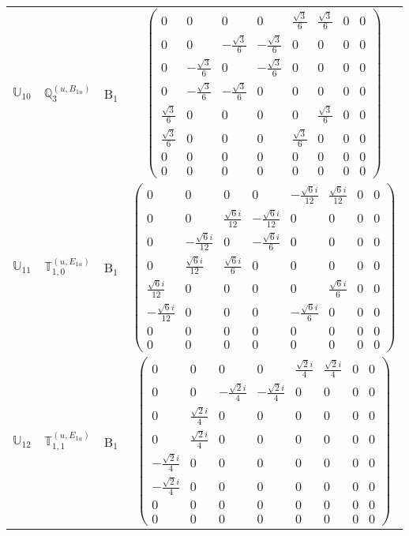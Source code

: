 \documentclass[fleqn,10pt,landscape]{article}
\begin{document}
\begin{itemize}
\begin{center}
\begin{longtable}{c|c|c|c}
$ \mathbb{U}_{10} $ & $\mathbb{Q}_{3}^{(u,B_{1u})}$ & B$_{1}$ & $\begin{pmatrix} 0 & 0 & 0 & 0 & \frac{\sqrt{3}}{6} & \frac{\sqrt{3}}{6} & 0 & 0 \\ 0 & 0 & - \frac{\sqrt{3}}{6} & - \frac{\sqrt{3}}{6} & 0 & 0 & 0 & 0 \\ 0 & - \frac{\sqrt{3}}{6} & 0 & - \frac{\sqrt{3}}{6} & 0 & 0 & 0 & 0 \\ 0 & - \frac{\sqrt{3}}{6} & - \frac{\sqrt{3}}{6} & 0 & 0 & 0 & 0 & 0 \\ \frac{\sqrt{3}}{6} & 0 & 0 & 0 & 0 & \frac{\sqrt{3}}{6} & 0 & 0 \\ \frac{\sqrt{3}}{6} & 0 & 0 & 0 & \frac{\sqrt{3}}{6} & 0 & 0 & 0 \\ 0 & 0 & 0 & 0 & 0 & 0 & 0 & 0 \\ 0 & 0 & 0 & 0 & 0 & 0 & 0 & 0 \end{pmatrix}$ \\
$ \mathbb{U}_{11} $ & $\mathbb{T}_{1,0}^{(u,E_{1u})}$ & B$_{1}$ & $\begin{pmatrix} 0 & 0 & 0 & 0 & - \frac{\sqrt{6} i}{12} & \frac{\sqrt{6} i}{12} & 0 & 0 \\ 0 & 0 & \frac{\sqrt{6} i}{12} & - \frac{\sqrt{6} i}{12} & 0 & 0 & 0 & 0 \\ 0 & - \frac{\sqrt{6} i}{12} & 0 & - \frac{\sqrt{6} i}{6} & 0 & 0 & 0 & 0 \\ 0 & \frac{\sqrt{6} i}{12} & \frac{\sqrt{6} i}{6} & 0 & 0 & 0 & 0 & 0 \\ \frac{\sqrt{6} i}{12} & 0 & 0 & 0 & 0 & \frac{\sqrt{6} i}{6} & 0 & 0 \\ - \frac{\sqrt{6} i}{12} & 0 & 0 & 0 & - \frac{\sqrt{6} i}{6} & 0 & 0 & 0 \\ 0 & 0 & 0 & 0 & 0 & 0 & 0 & 0 \\ 0 & 0 & 0 & 0 & 0 & 0 & 0 & 0 \end{pmatrix}$ \\
$ \mathbb{U}_{12} $ & $\mathbb{T}_{1,1}^{(u,E_{1u})}$ & B$_{1}$ & $\begin{pmatrix} 0 & 0 & 0 & 0 & \frac{\sqrt{2} i}{4} & \frac{\sqrt{2} i}{4} & 0 & 0 \\ 0 & 0 & - \frac{\sqrt{2} i}{4} & - \frac{\sqrt{2} i}{4} & 0 & 0 & 0 & 0 \\ 0 & \frac{\sqrt{2} i}{4} & 0 & 0 & 0 & 0 & 0 & 0 \\ 0 & \frac{\sqrt{2} i}{4} & 0 & 0 & 0 & 0 & 0 & 0 \\ - \frac{\sqrt{2} i}{4} & 0 & 0 & 0 & 0 & 0 & 0 & 0 \\ - \frac{\sqrt{2} i}{4} & 0 & 0 & 0 & 0 & 0 & 0 & 0 \\ 0 & 0 & 0 & 0 & 0 & 0 & 0 & 0 \\ 0 & 0 & 0 & 0 & 0 & 0 & 0 & 0 \end{pmatrix}$ \\

\end{longtable}
\end{center}
\end{itemize}
\end{document}

